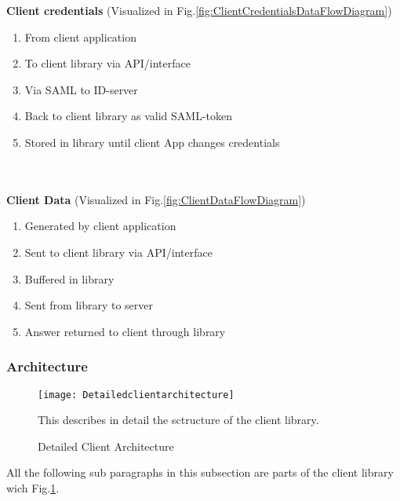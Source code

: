		\textbf{Client credentials} (Visualized in Fig.\ref{fig:ClientCredentialsDataFlowDiagram})
		\begin{enumerate}
			\item From client application
			\item To client library via API/interface
			\item Via SAML to ID-server
			\item Back to client library as valid SAML-token
			\item Stored in library until client App changes credentials
		\end{enumerate}
		\\\\
		\textbf{Client Data} (Visualized in Fig.\ref{fig:ClientDataFlowDiagram})
		\begin{enumerate}
			\item Generated by client application
			\item Sent to client library via API/interface
			\item Buffered in library
			\item Sent from library to server
			\item Answer returned to client through library
		\end{enumerate}
		
	\subsubsection{Architecture}\label{client architecture}
		\begin{figure}[h]
			\centering	
			\texttt{[image: Detailedclientarchitecture]}
			\caption{Detailed Client Architecture}
			This describes in detail the sctructure of the client library. 
			\label{fig:DetailedClientArchitecture}
		\end{figure}

    All the following sub paragraphs in this subsection are parts of the client library wich Fig.\ref{fig:DetailedClientArchitecture}.  \\ 
    
